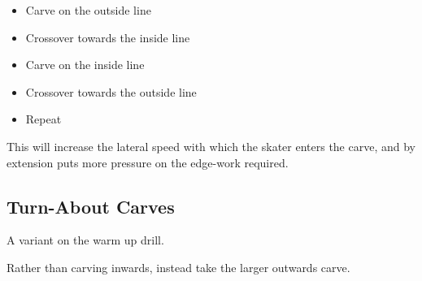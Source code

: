 \begin{itemize}
    \item Carve on the outside line
    \item Crossover towards the inside line 
    \item Carve on the inside line
    \item Crossover towards the outside line
    \item Repeat 
\end{itemize}

This will increase the lateral speed with which the skater enters the carve, and by extension puts more pressure on the edge-work required.      

\subsection*{Turn-About Carves}

A variant on the warm up drill.

Rather than carving inwards, instead take the larger outwards carve.  
